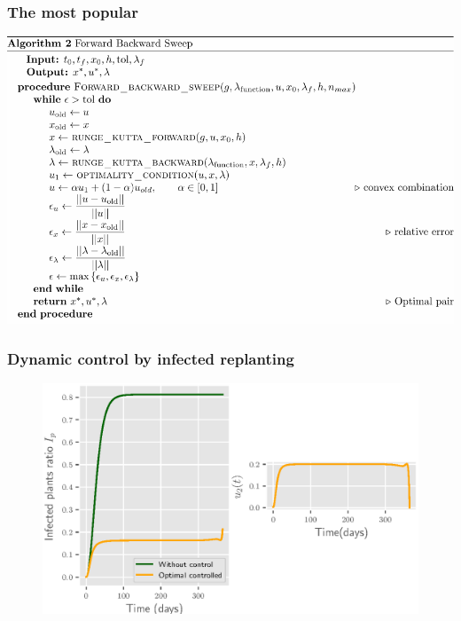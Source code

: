 	\begin{frame}[plain]\frametitle{The most popular}
		\includegraphics[width=1\linewidth]{Feathergraphics/fbs_algorithm.pdf}
	\end{frame}
	
	\begin{frame}[plain]
		\frametitle{Dynamic control by infected replanting}
		\begin{figure}
			\centering	
			\includegraphics[scale=0.5]{Feathergraphics/only_infected_replanting.eps}
		\end{figure}	
	\end{frame}

